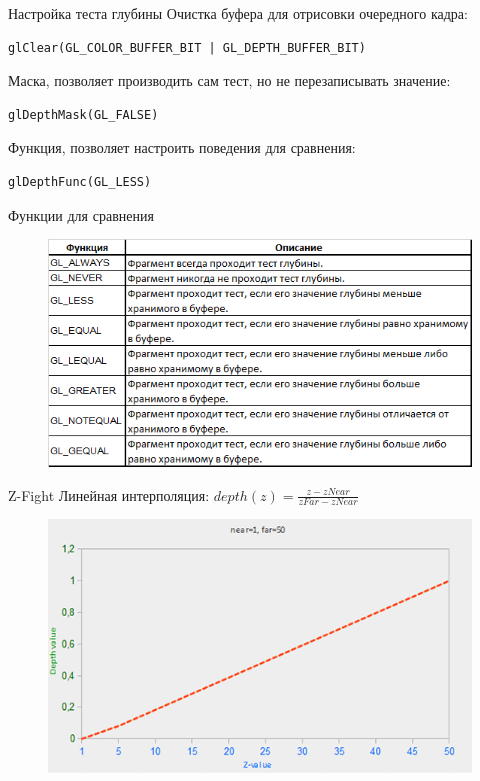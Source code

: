 \documentclass[aspectration=1610,t]{beamer}
\begin{document}
\begin{frame}[fragile]{Настройка теста глубины}
    Очистка буфера для отрисовки очередного кадра:
    {\small \begin{lstlisting}
glClear(GL_COLOR_BUFFER_BIT | GL_DEPTH_BUFFER_BIT)
    \end{lstlisting}}
    Маска, позволяет производить сам тест, но не перезаписывать значение:
    {\small \begin{lstlisting}
glDepthMask(GL_FALSE)
    \end{lstlisting}}
    Функция, позволяет настроить поведения для сравнения:
    {\small \begin{lstlisting}
glDepthFunc(GL_LESS)
    \end{lstlisting}}
\end{frame}

\begin{frame}[fragile]{Функции для сравнения}
    \begin{figure}[htp]
        \centering
        \includegraphics[scale=0.60]{res/depth_functions}
    \end{figure}
\end{frame}

\begin{frame}[fragile]{Z-Fight}
    Линейная интерполяция:
    $depth(z) = \frac{z - zNear}{zFar - zNear}$
    \begin{figure}[htp]
        \centering
        \includegraphics[scale=0.50]{res/lin_z}
    \end{figure}
\end{frame}
\end{document}
